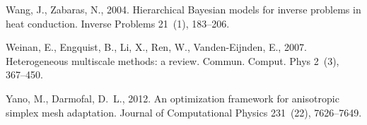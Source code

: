 \documentclass[review,sort&compress]{elsarticle}
\begin{document}
\begin{thebibliography}{42}
Wang, J., Zabaras, N., 2004. Hierarchical {B}ayesian models for inverse
  problems in heat conduction. Inverse Problems 21~(1), 183--206.

Weinan, E., Engquist, B., Li, X., Ren, W., Vanden-Eijnden, E., 2007.
  Heterogeneous multiscale methods: a review. Commun. Comput. Phys 2~(3),
  367--450.

Yano, M., Darmofal, D.~L., 2012. An optimization framework for anisotropic
  simplex mesh adaptation. Journal of Computational Physics 231~(22),
  7626--7649.

\end{thebibliography}
\end{document}
